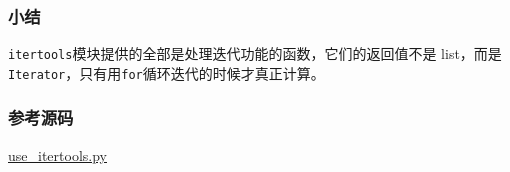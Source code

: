 \hypertarget{ux5c0fux7ed3}{%
\subsubsection{小结}\label{ux5c0fux7ed3}}

\texttt{itertools}模块提供的全部是处理迭代功能的函数，它们的返回值不是
list，而是\texttt{Iterator}，只有用\texttt{for}循环迭代的时候才真正计算。

\hypertarget{ux53c2ux8003ux6e90ux7801}{%
\subsubsection{参考源码}\label{ux53c2ux8003ux6e90ux7801}}

\href{https://github.com/michaelliao/learn-python3/blob/master/samples/commonlib/use_itertools.py}{use\_itertools.py}

